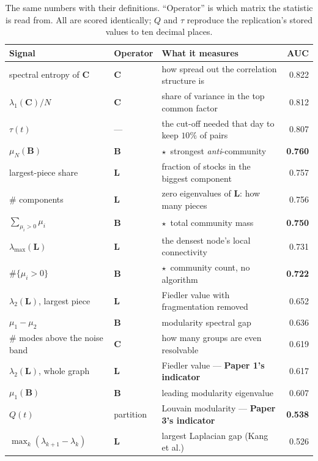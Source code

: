 \documentclass[11pt,a4paper]{article}
\newcommand{\Q}{Q}
\newcommand{\Lap}{\mathbf{L}}
\newcommand{\Bmat}{\mathbf{B}}
\newcommand{\Cmat}{\mathbf{C}}
\begin{document}
\begin{table}[t]
\centering\small
\caption{The same numbers with their definitions. ``Operator'' is which matrix
the statistic is read from. All are scored identically; $\Q$ and $\tau$ reproduce
the replication's stored values to ten decimal places.}
\label{tab:leaderboard}
\begin{tabular}{@{}lllr@{}}
\toprule
\textbf{Signal} & \textbf{Operator} & \textbf{What it measures} & \textbf{AUC} \\
\midrule
spectral entropy of $\Cmat$ & $\Cmat$ & how spread out the correlation structure is & 0.822 \\
$\lambda_1(\Cmat)/N$ & $\Cmat$ & share of variance in the top common factor & 0.812 \\
$\tau(t)$ & --- & the cut-off needed that day to keep $10\%$ of pairs & 0.807 \\
$\mu_N(\Bmat)$ & $\Bmat$ & $\star$\ strongest \emph{anti}-community & \textbf{0.760} \\
largest-piece share & $\Lap$ & fraction of stocks in the biggest component & 0.757 \\
\# components & $\Lap$ & zero eigenvalues of $\Lap$: how many pieces & 0.756 \\
$\sum_{\mu_i>0}\mu_i$ & $\Bmat$ & $\star$\ total community mass & \textbf{0.750} \\
$\lambda_{\max}(\Lap)$ & $\Lap$ & the densest node's local connectivity & 0.731 \\
$\#\{\mu_i>0\}$ & $\Bmat$ & $\star$\ community count, no algorithm & \textbf{0.722} \\
$\lambda_2(\Lap)$, largest piece & $\Lap$ & Fiedler value with fragmentation removed & 0.652 \\
$\mu_1-\mu_2$ & $\Bmat$ & modularity spectral gap & 0.636 \\
\# modes above the noise band & $\Cmat$ & how many groups are even resolvable & 0.619 \\
$\lambda_2(\Lap)$, whole graph & $\Lap$ & Fiedler value --- \textbf{Paper 1's indicator} & 0.617 \\
$\mu_1(\Bmat)$ & $\Bmat$ & leading modularity eigenvalue & 0.607 \\
$\Q(t)$ & partition & Louvain modularity --- \textbf{Paper 3's indicator} & \textbf{0.538} \\
$\max_k(\lambda_{k+1}-\lambda_k)$ & $\Lap$ & largest Laplacian gap (Kang et al.) & 0.526 \\
\bottomrule
\end{tabular}
\end{table}
\end{document}
